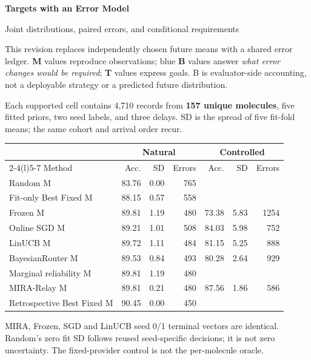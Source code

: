 \documentclass[10pt,letterpaper]{article}
\newcommand{\NA}{\textemdash}
\newcommand{\note}[1]{{\fontsize{8.5}{10.5}\selectfont #1\par}}
\newcommand{\sect}[1]{\vspace{5pt}{\large\bfseries #1}\par\vspace{2pt}}
\newenvironment{clean}{\begin{center}\fontsize{9.5}{11.5}\selectfont\setlength{\tabcolsep}{6pt}\renewcommand{\arraystretch}{1.06}}{\end{center}}
\begin{document}
{\LARGE\bfseries Targets with an Error Model}\par
{\large Joint distributions, paired errors, and conditional requirements}\par
This revision replaces independently chosen future means with a shared error ledger.
\textbf{M} values reproduce observations; blue \textbf{B} values answer \emph{what error changes would be required};
\textbf{T} values express goals. B is evaluator-side accounting, not a deployable strategy or a predicted future distribution.

\sect{E1 / body Table 3: measured comparison and spread}
Each supported cell contains 4,710 records from \textbf{157 unique molecules}, five fitted priors,
two seed labels, and three delays. SD is the spread of five fit-fold means; the same cohort and arrival order recur.
\par\noindent\begin{minipage}{\linewidth}\end{minipage}\par
\begin{clean}\begin{tabular}{@{}lrrrrrr@{}}
\toprule
& \multicolumn{3}{c}{Natural} & \multicolumn{3}{c}{Controlled} \\ \cmidrule(lr){2-4}\cmidrule(l){5-7} Method & Acc. & SD & Errors & Acc. & SD & Errors \\
\midrule
Random M & 83.76 & 0.00 & 765 & \NA & \NA & \NA \\
Fit-only Best Fixed M & 88.15 & 0.57 & 558 & \NA & \NA & \NA \\
Frozen M & 89.81 & 1.19 & 480 & 73.38 & 5.83 & 1254 \\
Online SGD M & 89.21 & 1.01 & 508 & 84.03 & 5.98 & 752 \\
LinUCB M & 89.72 & 1.11 & 484 & 81.15 & 5.25 & 888 \\
BayesianRouter M & 89.53 & 0.84 & 493 & 80.28 & 2.64 & 929 \\
Marginal reliability M & 89.81 & 1.19 & 480 & \NA & \NA & \NA \\
MIRA-Relay M & 89.81 & 0.21 & 480 & 87.56 & 1.86 & 586 \\
Retrospective Best Fixed M & 90.45 & 0.00 & 450 & \NA & \NA & \NA \\
\bottomrule\end{tabular}\end{clean}
\note{MIRA, Frozen, SGD and LinUCB seed 0/1 terminal vectors are identical. Random's zero fit SD follows reused seed-specific decisions; it is not zero uncertainty. The fixed-provider control is not the per-molecule oracle.}
\end{document}
